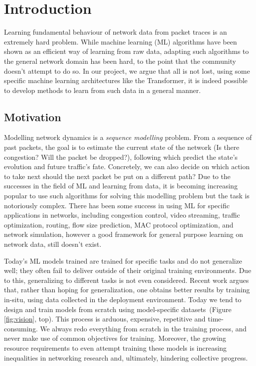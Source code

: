 \chapter{Introduction}
\label{cha:introduction}

Learning fundamental behaviour of network data from packet traces is an extremely hard problem. While machine learning (ML) algorithms have been shown as an efficient way of learning from raw data, adapting such algorithms to the general network domain has been hard, to the point that the community doesn't attempt to do so. In our project, we argue that all is not lost, using some specific machine learning architectures like the Transformer, it is indeed possible to develop methods to learn from such data in a general manner.

\section{Motivation}
\label{sec:motivation}

Modelling network dynamics is a \emph{sequence modelling} problem. From a sequence of past packets, the goal is to estimate the current state of the network (\eg Is there congestion? Will the packet be dropped?), following which predict the state's evolution and future traffic's fate. Concretely, we can also decide on which action to take next \eg should the next packet be put on a different path? Due to the successes in the field of ML and learning from data, it is becoming increasing popular to use such algorithms for solving this modelling problem but the task is notoriously complex. There has been some success in using ML for specific applications in networks, including congestion control\cite{classic,jayDeepReinforcementLearning2019,dynamic,exmachina},
video streaming\cite{oboe,maoNeuralAdaptiveVideo2017,puffer},
traffic optimization\cite{auto},
routing\cite{learnroute},
flow size prediction\cite{flow,onlineflow},
MAC protocol optimization\cite{oneproto,heterowire},
and network simulation\cite{zhangMimicNetFastPerformance2021}, however a good framework for general purpose learning on network data, still doesn't exist.

Today's ML models trained are trained for specific tasks and do not generalize well; \ie they often fail to deliver outside of their original training environments\cite{puffer, datadriven, blackbox}. Due to this, generalizing to different tasks is not even considered. Recent work argues that, rather than hoping for generalization, one obtains better results by training in-situ, \ie using data collected in the deployment environment\cite{puffer}.
Today we tend to design and train models from scratch using model-specific datasets~(Figure \ref{fig:vision}, top). This process is arduous, expensive, repetitive and time-consuming. We always redo everything from scratch in the training process, and never make use of common objectives for training. Moreover, the growing resource requirements to even attempt training these models is increasing inequalities in networking research and, ultimately, hindering collective progress.

